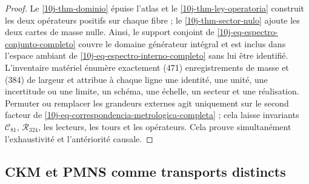 \begin{proof}
Le \cref{10j-thm-dominio} épuise l'atlas et le \cref{10j-thm-ley-operatoria} construit les deux opérateurs positifs sur chaque fibre ; le \cref{10j-thm-sector-nulo} ajoute les deux cartes de masse nulle. Ainsi, le support conjoint de \eqref{10j-eq-espectro-conjunto-completo} couvre le domaine générateur intégral et est inclus dans l'espace ambiant de \eqref{10j-eq-espectro-interno-completo} sans lui être identifié. L'inventaire matériel énumère exactement (471) enregistrements de masse et (384) de largeur et attribue à chaque ligne une identité, une unité, une incertitude ou une limite, un schéma, une échelle, un secteur et une réalisation. Permuter ou remplacer les grandeurs externes agit uniquement sur le second facteur de \eqref{10j-eq-correspondencia-metrologica-completa} ; cela laisse invariants \(\mathcal C_{81}\), \(\mathcal R_{324}\), les lecteurs, les tours et les opérateurs. Cela prouve simultanément l'exhaustivité et l'antériorité causale.
\end{proof}

\subsection{CKM et PMNS comme transports distincts}

